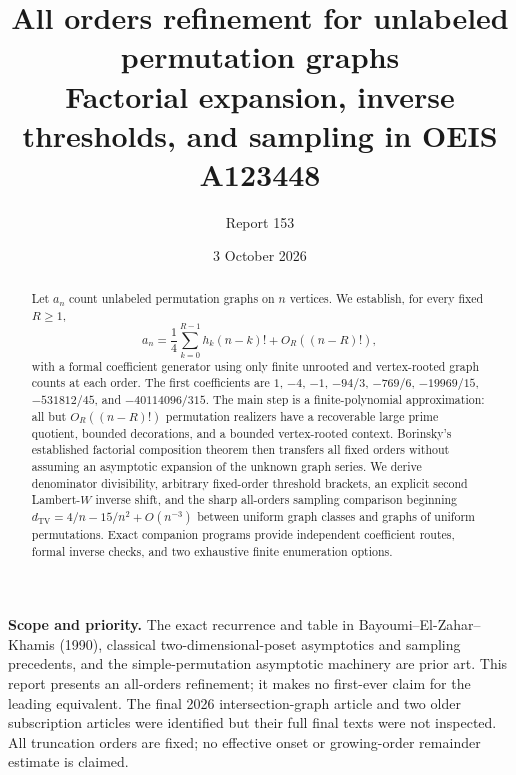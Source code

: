 \documentclass[11pt,letterpaper]{article}
\title{All orders refinement for unlabeled permutation graphs\\\large Factorial expansion, inverse thresholds, and sampling in OEIS A123448}
\author{Report 153}
\date{3 October 2026}
\numberwithin{equation}{section}
\theoremstyle{definition}\newtheorem{definition}[theorem]{Definition}
\theoremstyle{remark}\newtheorem{remark}[theorem]{Remark}
\DeclareMathOperator{\TV}{TV}
\begin{document}
\maketitle
\begin{abstract}
Let $a_n$ count unlabeled permutation graphs on $n$ vertices. We establish,
for every fixed $R\geq1$,
\[
 a_n=\frac14\sum_{k=0}^{R-1}h_k(n-k)!+O_R((n-R)!),
\]
with a formal coefficient generator using only finite unrooted and
vertex-rooted graph counts at each order. The first coefficients are
$1$, $-4$, $-1$, $-94/3$, $-769/6$, $-19969/15$,
$-531812/45$, and $-40114096/315$.
The main step is a finite-polynomial approximation: all but
$O_R((n-R)!)$ permutation realizers have a recoverable large prime
quotient, bounded decorations, and a bounded vertex-rooted context.
Borinsky's established factorial composition theorem then transfers
all fixed orders without assuming an asymptotic expansion of the
unknown graph series. We derive denominator divisibility,
arbitrary fixed-order threshold brackets, an explicit second
Lambert-$W$ inverse shift, and the sharp all-orders sampling comparison beginning
$d_{\TV}=4/n-15/n^2+O(n^{-3})$ between uniform graph classes and graphs of
uniform permutations. Exact companion programs provide independent
coefficient routes, formal inverse checks, and two exhaustive finite
enumeration options.
\end{abstract}
\noindent\textbf{Scope and priority.}
The exact recurrence and table in Bayoumi--El-Zahar--Khamis (1990),
classical two-dimensional-poset asymptotics and sampling precedents,
and the simple-permutation asymptotic machinery are prior art.
This report presents an all-orders refinement; it makes no first-ever
claim for the leading equivalent. The final 2026 intersection-graph
article and two older subscription articles were identified but their
full final texts were not inspected. All truncation orders are fixed;
no effective onset or growing-order remainder estimate is claimed.
\end{document}

